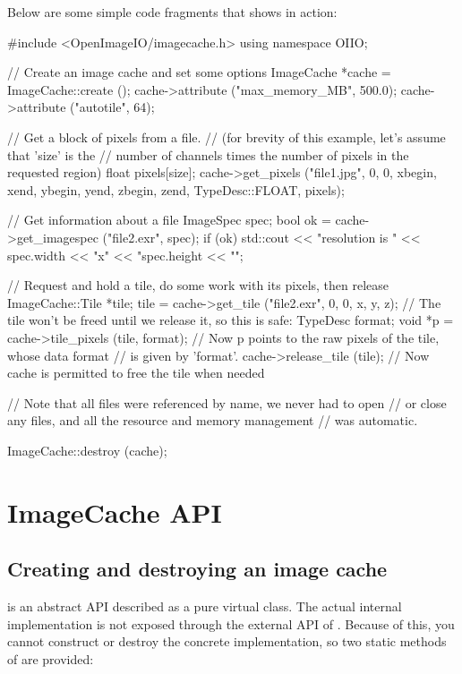 \newpage
Below are some simple code fragments that shows \ImageCache in action:
\medskip

\begin{code}
    #include <OpenImageIO/imagecache.h>
    using namespace OIIO;

    // Create an image cache and set some options
    ImageCache *cache = ImageCache::create ();
    cache->attribute ("max_memory_MB", 500.0);
    cache->attribute ("autotile", 64);

    // Get a block of pixels from a file.
    // (for brevity of this example, let's assume that 'size' is the
    // number of channels times the number of pixels in the requested region)
    float pixels[size];
    cache->get_pixels ("file1.jpg", 0, 0, xbegin, xend, ybegin, yend,
                       zbegin, zend, TypeDesc::FLOAT, pixels);

    // Get information about a file
    ImageSpec spec;
    bool ok = cache->get_imagespec ("file2.exr", spec);
    if (ok)
        std::cout << "resolution is " << spec.width << "x" 
                  << "spec.height << "\n";

    // Request and hold a tile, do some work with its pixels, then release
    ImageCache::Tile *tile;
    tile = cache->get_tile ("file2.exr", 0, 0, x, y, z);
    // The tile won't be freed until we release it, so this is safe:
    TypeDesc format;
    void *p = cache->tile_pixels (tile, format);
    // Now p points to the raw pixels of the tile, whose data format
    // is given by 'format'.
    cache->release_tile (tile);  
    // Now cache is permitted to free the tile when needed

    // Note that all files were referenced by name, we never had to open
    // or close any files, and all the resource and memory management 
    // was automatic.

    ImageCache::destroy (cache);
\end{code}

\newpage
\section{ImageCache API}
\label{sec:imagecache:api}

\subsection{Creating and destroying an image cache}
\label{sec:imagecache:api:createdestroy}

\ImageCache is an abstract API described as a pure virtual class.  The
actual internal implementation is not exposed through the external API
of \product.  Because of this, you cannot construct or destroy the
concrete implementation, so two static methods of \ImageCache are
provided:

